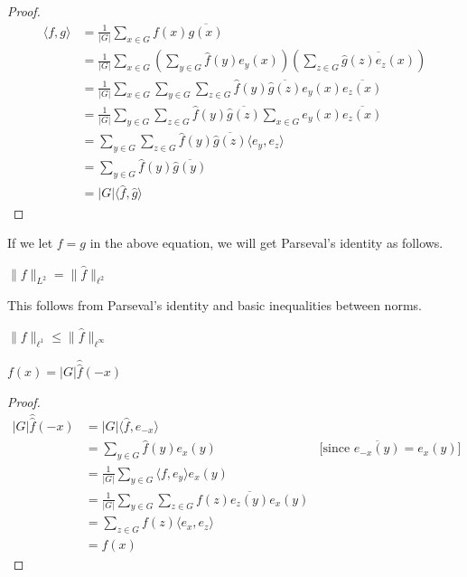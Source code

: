 \begin{proof}
\begin{align*}
\langle f, g \rangle  
& = \frac{1}{|G|} \sum\limits_{x \in G} f(x) \overline{g(x)} \\
& = \frac{1}{|G|} \sum\limits_{x \in G} 
		\left( \sum\limits_{y \in G} \widehat{f}(y)  e_y(x) \right)
		\left( \sum\limits_{z \in G} \overline{\widehat{g}(z) e_z(x)} \right) \\
& = \frac{1}{|G|} \sum\limits_{x \in G} 
			 \sum\limits_{y \in G} \sum\limits_{z \in G}
			 \widehat{f}(y) \overline{\widehat{g}(z)}
			 e_y(x) \overline{e_z(x)}  \\
& = \frac{1}{|G|}  
			 \sum\limits_{y \in G} \sum\limits_{z \in G}
			 \widehat{f}(y) \overline{\widehat{g}(z)}
			 \sum\limits_{x \in G} e_y(x) \overline{e_z(x)}  \\
& = 		 \sum\limits_{y \in G} \sum\limits_{z \in G}
			 \widehat{f}(y) \overline{\widehat{g}(z)}
			 \langle e_y,  e_z \rangle  \\
& = 		 \sum\limits_{y \in G}
			 \widehat{f}(y) \overline{\widehat{g}(y)} \\
& = |G| \langle \widehat{f}, \widehat{g} \rangle			 			 		
\end{align*}
\end{proof}
If we let $f =g$ in the above equation, we will get Parseval's identity as follows. 

\begin{prop}
$\| f \|_{L^2} = \| \widehat{f} \|_{\ell^2} $
\end{prop}
This follows from Parseval's identity and basic inequalities between norms.

\begin{prop}
$ \| f \|_{\ell^1} \leq \| \widehat{f} \|_{\ell^\infty}$
\end{prop}
\begin{prop} 
$f(x) = |G| \hat{\hat{f}}(-x)$
\end{prop}

\begin{proof}
\begin{align*}
|G| \hat{\hat{f}}(-x)
& = |G| \langle \widehat{f}, e_{-x} \rangle \\
& = \sum\limits_{y \in G} \widehat{f}(y) e_{x}(y)  
     	&\text{[since } \overline{e_{-x}(y)} = e_x(y)]\\
& = \frac{1}{|G|}
	\sum\limits_{y \in G} 
	\langle f, e_y \rangle  e_{x}(y)\\
& = \frac{1}{|G|}
	\sum\limits_{y \in G} 
		\sum\limits_{z \in G}f(z) \overline{e_z(y)}  e_{x}(y) \\
& = \sum\limits_{z \in G}f(z) \langle e_x,  e_{z} \rangle \\
& = f(x)		
\end{align*}
\end{proof}

